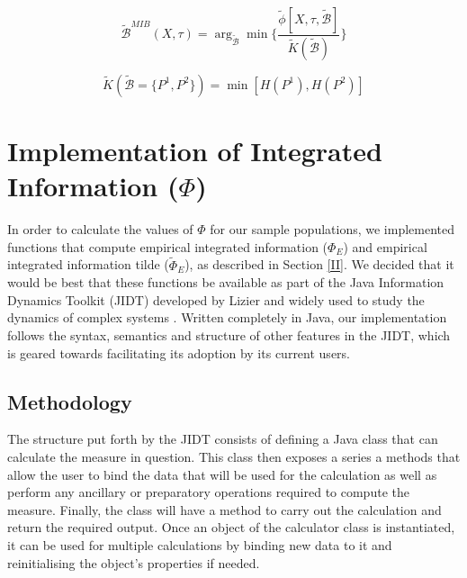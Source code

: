 \documentclass[a4paper,11pt]{article}
\begin{document}
\begin{equation}
\label{eq:mib-tilde}
\widetilde{\mathcal{B}}^{MIB}(X, \tau) = \arg_{\widetilde{\mathcal{B}}} \min \Big\lbrace \frac{\tilde{\phi} [X, \tau, \widetilde{\mathcal{B}}]}{\widetilde{K}(\widetilde{\mathcal{B}})} \Big\rbrace
\end{equation}

\begin{equation}
\label{eq:norm-tilde}
\widetilde{K}(\widetilde{\mathcal{B}} = \lbrace P^1, P^2 \rbrace) = \min[H(P^1), H(P^2)]
\end{equation}

\clearpage
\section{Implementation of Integrated Information ($\Phi$)}
\label{sec:impl}

In order to calculate the values of $\Phi$ for our sample populations, we implemented functions that compute empirical integrated information ($\Phi_{E}$) and empirical integrated information tilde ($\widetilde{\Phi}_{E}$), as described in Section \ref{II}. We decided that it would be best that these functions be available as part of the Java Information Dynamics Toolkit (JIDT) developed by Lizier and widely used to study the dynamics of complex systems \cite{Lizier2014}. Written completely in Java, our implementation follows the syntax, semantics and structure of other features in the JIDT, which is geared towards facilitating its adoption by its current users.

\subsection{Methodology}
\label{sec:impl:methods}

The structure put forth by the JIDT consists of defining a Java class that can calculate the measure in question. This class then exposes a series a methods that allow the user to bind the data that will be used for the calculation as well as perform any ancillary or preparatory operations required to compute the measure. Finally, the class will have a method to carry out the calculation and return the required output. Once an object of the calculator class is instantiated, it can be used for multiple calculations by binding new data to it and reinitialising the object's properties if needed. 
\end{document}
